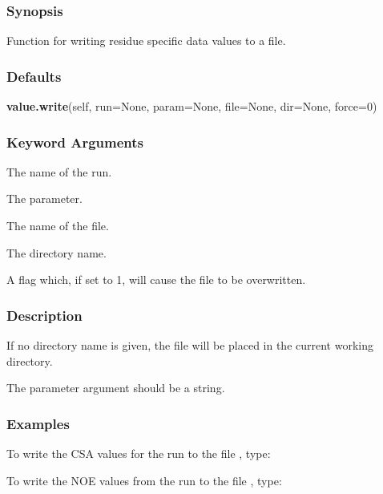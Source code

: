 \subsubsection{Synopsis}

Function for writing residue specific data values to a file.



\subsubsection{Defaults}

\textsf{\textbf{value.write}(self, run=None, param=None, file=None, dir=None, force=0)}


\subsubsection{Keyword Arguments}

  The name of the run. 

  The parameter. 

  The name of the file. 

  The directory name. 

  A flag which, if set to 1, will cause the file to be overwritten. 




\subsubsection{Description}

If no directory name is given, the file will be placed in the current working directory.


The parameter argument should be a string.



\subsubsection{Examples}

To write the CSA values for the run  to the file , type:




To write the NOE values from the run  to the file , type:


